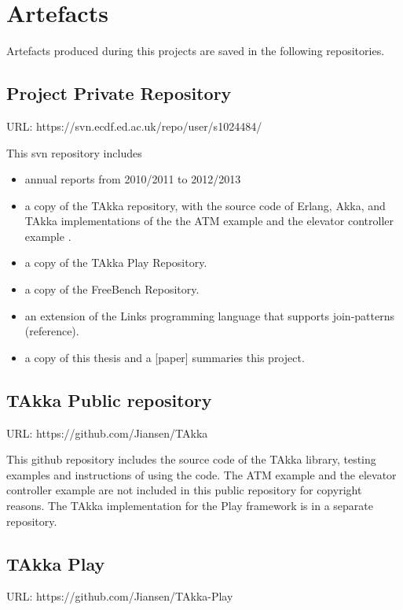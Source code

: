 \chapter{Artefacts}

Artefacts produced during this projects are saved in the following repositories.

\section{Project Private Repository}

URL: https://svn.ecdf.ed.ac.uk/repo/user/s1024484/

This svn repository includes 


\begin{itemize}
  \item annual reports from 2010/2011 to 2012/2013
  \item a copy of the TAkka repository, with the source code of Erlang, Akka, 
and TAkka implementations of the the ATM example \citep{atmprivate} and the 
elevator controller example \citep{quviq}.
  \item a copy of the TAkka Play Repository.
  \item a copy of the FreeBench Repository.
  \item an extension of the Links programming language that supports 
join-patterns (reference).
  \item a copy of this thesis and a [paper] summaries this project.
\end{itemize}


\section{TAkka Public repository}

URL: https://github.com/Jiansen/TAkka

This github repository includes the source code of the TAkka library, testing 
examples and instructions of using the code.  The ATM example \citep{atmprivate} 
and the elevator controller example \citep{quviq} are not included in this 
public repository for copyright reasons.  The TAkka implementation for the Play 
framework is in a separate repository.

\section{TAkka Play}
URL: https://github.com/Jiansen/TAkka-Play

